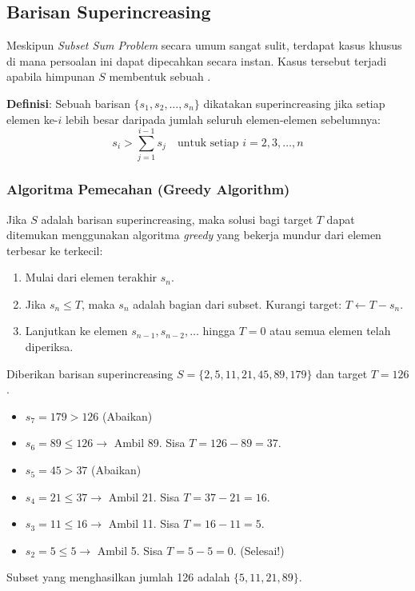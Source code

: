 \subsection{Barisan Superincreasing}

Meskipun \textit{Subset Sum Problem} secara umum sangat sulit, terdapat kasus khusus di mana persoalan ini dapat dipecahkan secara instan. Kasus tersebut terjadi apabila himpunan $S$ membentuk sebuah .

\textbf{Definisi}: Sebuah barisan $\{s_1, s_2, \dots, s_n\}$ dikatakan superincreasing jika setiap elemen ke-$i$ lebih besar daripada jumlah seluruh elemen-elemen sebelumnya:
\begin{equation}
  s_i > \sum_{j=1}^{i-1} s_j \quad \text{untuk setiap } i = 2, 3, \dots, n
\end{equation}

\subsubsection{Algoritma Pemecahan (Greedy Algorithm)}
Jika $S$ adalah barisan superincreasing, maka solusi bagi target $T$ dapat ditemukan menggunakan algoritma \textit{greedy} yang bekerja mundur dari elemen terbesar ke terkecil:

\begin{enumerate}
    \item Mulai dari elemen terakhir $s_n$.
    \item Jika $s_n \le T$, maka $s_n$ adalah bagian dari subset. Kurangi target: $T \leftarrow T - s_n$.
    \item Lanjutkan ke elemen $s_{n-1}, s_{n-2}, \dots$ hingga $T = 0$ atau semua elemen telah diperiksa.
\end{enumerate}

\begin{contoh}
Diberikan barisan superincreasing $S = \{2, 5, 11, 21, 45, 89, 179\}$ dan target $T = 126$.
\begin{itemize}
    \item $s_7 = 179 > 126$ (Abaikan)
    \item $s_6 = 89 \le 126 \rightarrow$ Ambil 89. Sisa $T = 126 - 89 = 37$.
    \item $s_5 = 45 > 37$ (Abaikan)
    \item $s_4 = 21 \le 37 \rightarrow$ Ambil 21. Sisa $T = 37 - 21 = 16$.
    \item $s_3 = 11 \le 16 \rightarrow$ Ambil 11. Sisa $T = 16 - 11 = 5$.
    \item $s_2 = 5 \le 5 \rightarrow$ Ambil 5. Sisa $T = 5 - 5 = 0$. (Selesai!)
\end{itemize}
Subset yang menghasilkan jumlah 126 adalah $\{5, 11, 21, 89\}$.
\end{contoh}

